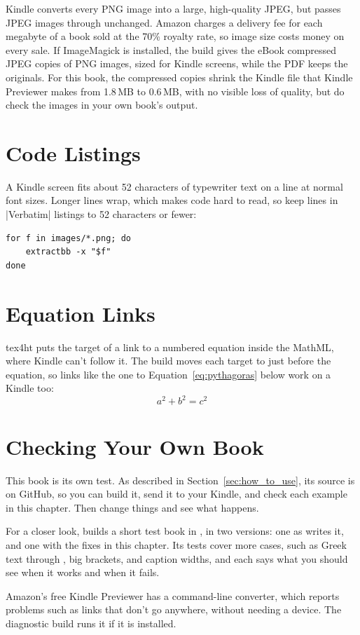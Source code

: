 Kindle converts every PNG image into a large, high-quality JPEG, but passes JPEG images through unchanged.
Amazon charges a delivery fee for each megabyte of a book sold at the 70\% royalty rate, so image size costs money on every sale.
If ImageMagick is installed, the build gives the eBook compressed JPEG copies of PNG images, sized for Kindle screens, while the PDF keeps the originals.
For this book, the compressed copies shrink the Kindle file that Kindle Previewer makes from 1.8\,MB to 0.6\,MB, with no visible loss of quality, but do check the images in your own book's output.

\section{Code Listings}

A Kindle screen fits about 52 characters of typewriter text on a line at normal font sizes.
Longer lines wrap, which makes code hard to read, so keep lines in \sverb|Verbatim| listings to 52 characters or fewer:

\begin{Verbatim}[fontsize=\small]
for f in images/*.png; do
    extractbb -x "$f"
done
\end{Verbatim}

\section{Equation Links}

tex4ht puts the target of a link to a numbered equation inside the MathML, where Kindle can't follow it.
The build moves each target to just before the equation, so links like the one to Equation~\ref{eq:pythagoras} below work on a Kindle too:
\begin{equation}
a^2 + b^2 = c^2
\label{eq:pythagoras}
\end{equation}

\section{Checking Your Own Book}

This book is its own test.
As described in Section~\ref{sec:how_to_use}, its source is on GitHub, so you can build it, send it to your Kindle, and check each example in this chapter.
Then change things and see what happens.

For a closer look,  builds a short test book in , in two versions: one as  writes it, and one with the fixes in this chapter.
Its tests cover more cases, such as Greek text through , big brackets, and caption widths, and each says what you should see when it works and when it fails.

Amazon's free Kindle Previewer has a command-line converter, which reports problems such as links that don't go anywhere, without needing a device.
The diagnostic build runs it if it is installed.
